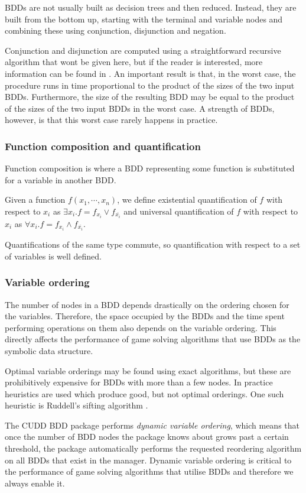 BDDs are not usually built as decision trees and then reduced. Instead, they are built from the bottom up, starting with the terminal and variable nodes and combining these using conjunction, disjunction and negation.

Conjunction and disjunction are computed using a straightforward recursive algorithm that wont be given here, but if the reader is interested, more information can be found in \cite{somenzi_bdd}. An important result is that, in the worst case, the procedure runs in time proportional to the product of the sizes of the two input BDDs. Furthermore, the size of the resulting BDD may be equal to the product of the sizes of the two input BDDs in the worst case. A strength of BDDs, however, is that this worst case rarely happens in practice. 

\subsubsection{Function composition and quantification}

Function composition is where a BDD representing some function is substituted for a variable in another BDD.

Given a function $f(x_1,\cdots,x_n)$, we define existential quantification of $f$ with respect to $x_i$ as $\exists x_i. f = f_{x_i} \vee f_{\overline{x_i}}$ and universal quantification of $f$ with respect to $x_i$ as $\forall x_i. f = f_{x_i} \wedge f_{\overline{x_i}}$.

Quantifications of the same type commute, so quantification with respect to a set of variables is well defined. 

\subsubsection{Variable ordering}

The number of nodes in a BDD depends drastically on the ordering chosen for the variables. Therefore, the space occupied by the BDDs and the time spent performing operations on them also depends on the variable ordering. This directly affects the performance of game solving algorithms that use BDDs as the symbolic data structure. 

Optimal variable orderings may be found using exact algorithms, but these are prohibitively expensive for BDDs with more than a few nodes. In practice heuristics are used which produce good, but not optimal orderings. One such heuristic is Ruddell's sifting algorithm \cite{sifting}.

The CUDD BDD package performs \emph{dynamic variable ordering}, which means that once the number of BDD nodes the package knows about grows past a certain threshold, the package automatically performs the requested reordering algorithm on all BDDs that exist in the manager. Dynamic variable ordering is critical to the performance of game solving algorithms that utilise BDDs and therefore we always enable it.

